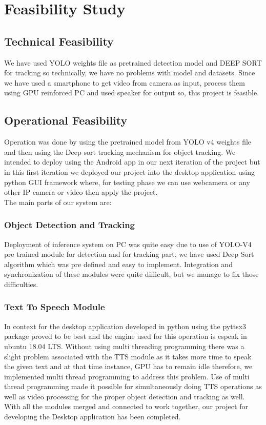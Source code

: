     \chapter{Feasibility Study}
        \section{Technical Feasibility}
            We have used YOLO weights file as pretrained detection model and DEEP SORT for tracking so technically, we have no problems with model and datasets. Since we have used a smartphone to get video from camera as input, process them using GPU reinforced PC and used speaker for output so, this project is feasible.
            
        \section{Operational Feasibility}
           Operation was done by using the pretrained model from YOLO v4 weights file and then using the Deep sort tracking mechanism for object tracking. We intended to deploy using the Android app in our next iteration of the project but in this first iteration we deployed our project into the desktop application using python GUI framework where, for testing phase we can use webcamera or any other IP camera or video then apply the project.\\
           The main parts of our system are:
           \subsection{Object Detection and Tracking}
                Deployment of inference system on PC was quite easy due to use of YOLO-V4 pre trained module for detection and for tracking part, we have used Deep Sort algorithm which was pre defined and easy to implement. Integration and synchronization of these modules were quite difficult, but we manage to fix those difficulties.
           \subsection{Text To Speech Module}
               In context for the desktop application developed in python using the pyttsx3 package proved to be best and the engine used for this operation is espeak in ubuntu 18.04 LTS.
               Without using multi threading programming there was a slight problem associated with the TTS module as it takes more time to speak the given text and at that time instance, GPU has to remain idle therefore, we implemented multi thread programming to address this problem. 
               Use of multi thread programming made it possible for simultaneously doing TTS operations as well as video processing for the proper object detection and tracking as well.\\
               With all the modules merged and connected to work together, our project for developing the Desktop application has been completed.

